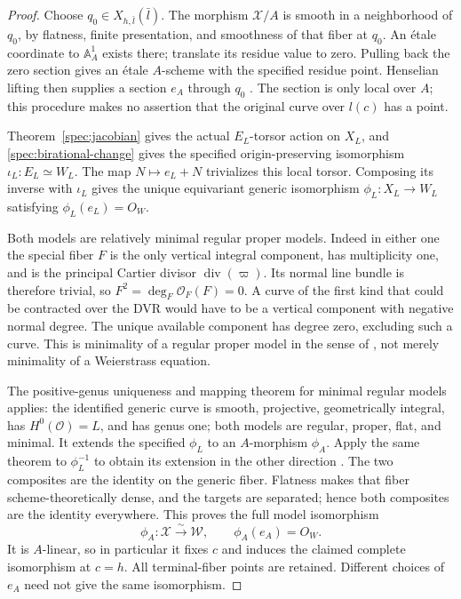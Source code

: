 \begin{proof}
Choose $q_0\in X_{h,\bar l}(\bar l)$.  The morphism $\mathcal X/A$
is smooth in a neighborhood of $q_0$, by flatness, finite
presentation, and smoothness of that fiber at $q_0$.  An \'{e}tale
coordinate to $\mathbb A^1_A$ exists there; translate its residue
value to zero.  Pulling back the zero section gives an \'{e}tale
$A$-scheme with the specified residue point.  Henselian lifting
then supplies a section $e_A$ through $q_0$
\cite[Tag 07LW]{StacksProject2026}.  The section is only local over
$A$; this procedure makes no assertion that the original curve over
$l(c)$ has a point.

Theorem~\ref{spec:jacobian} gives the actual $E_L$-torsor action on
$X_L$, and \eqref{spec:birational-change} gives the specified
origin-preserving isomorphism $\iota_L:E_L\simeq W_L$.
The map $N\mapsto e_L+N$ trivializes this local torsor.  Composing
its inverse with $\iota_L$ gives the unique equivariant generic
isomorphism $\phi_L:X_L\to W_L$ satisfying
$\phi_L(e_L)=O_W$.

Both models are relatively minimal regular proper models.  Indeed
in either one the special fiber $F$ is the only vertical integral
component, has multiplicity one, and is the principal Cartier
divisor $\operatorname{div}(\varpi)$.  Its normal line bundle is
therefore trivial, so $F^2=\deg_F\mathcal O_F(F)=0$.
A curve of the first kind that could be contracted over the DVR
would have to be a vertical component with negative normal degree.
The unique available component has degree zero, excluding such a
curve.  This is minimality of a regular proper model in the sense of
\cite[Definition 55.8.4, Tag 0C2V]{StacksProject2026}, not merely
minimality of a Weierstrass equation.

The positive-genus uniqueness and mapping theorem for minimal
regular models applies: the identified generic curve is smooth,
projective, geometrically integral, has $H^0(\mathcal O)=L$, and
has genus one; both models are regular, proper, flat, and minimal.
It extends the specified $\phi_L$ to an $A$-morphism $\phi_A$.
Apply the same theorem to $\phi_L^{-1}$ to obtain its extension in
the other direction
\cite[Lemmas 55.10.1--55.10.2, Tags 0C6B and 0C9Z]{StacksProject2026}.
The two composites are the identity on the generic fiber.  Flatness
makes that fiber scheme-theoretically dense, and the targets are
separated; hence both composites are the identity everywhere.
This proves the full model isomorphism
\begin{equation}
\phi_A:\mathcal X\xrightarrow{\sim}\mathcal W,
\qquad \phi_A(e_A)=O_W.
\label{hasse:complete-model-isomorphism}
\end{equation}
It is $A$-linear, so in particular it fixes $c$ and induces the
claimed complete isomorphism at $c=h$.  All terminal-fiber points
are retained.  Different choices of $e_A$ need not give the same
isomorphism.


\end{proof}
